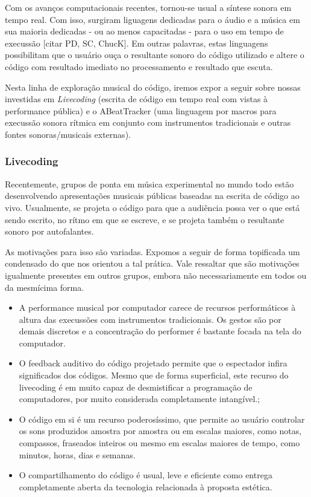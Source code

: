 Com os avanços computacionais recentes, tornou-se usual a síntese sonora
em tempo real. Com isso, surgiram liguagens dedicadas para o áudio e a música
em sua maioria dedicadas - ou ao menos capacitadas - para o uso 
em tempo de execussão [citar PD, SC, ChucK]. Em outras palavras, estas linguagens
possibilitam que o usuário ouça o resultante sonoro do código utilizado e altere
o código com resultado imediato no processamento e resultado que escuta.

Nesta linha de exploração musical do código, iremos expor a seguir sobre
nossas investidas em \emph{Livecoding} (escrita de código em tempo real
com vistas à performance pública) e o ABeatTracker (uma linguagem por macros
para execussão sonora rítmica em conjunto com instrumentos tradicionais e outras
fontes sonoras/musicais externas).


        \subsubsection{Livecoding}

Recentemente, grupos de ponta em música experimental no mundo todo estão
desenvolvendo apresentações musicais públicas baseadas na escrita
de código ao vivo. Usualmente, se projeta o código para que a audiência possa
ver o que está sendo escrito, no rítmo em que se escreve, e se projeta também
o resultante sonoro por autofalantes.

As motivações para isso são variadas. Expomos a seguir de forma topificada
um condensado do que nos orientou a tal prática. Vale ressaltar que são
motivações igualmente presentes em outros grupos, embora não necessariamente
em todos ou da mesmícima forma.

\begin{itemize}
    \item A performance musical por computador carece de recursos performáticos
    à altura das execussões com instrumentos tradicionais. Os gestos são por demais
    discretos e a concentração do performer é bastante focada na tela do computador.
    \item O feedback auditivo do código projetado permite que o espectador infira
    significados dos códigos. Mesmo que de forma superficial, este recurso do livecoding
    é em muito capaz de desmistificar a programação de computadores, por muito considerada
    completamente intangível.;
    \item O código em si é um recurso poderosíssimo, que permite ao usuário controlar
    os sons produzidos amostra por amostra ou em escalas maiores, como notas, compassos, fraseados
    inteiros ou mesmo em escalas maiores de tempo, como minutos, horas, dias e semanas.
    \item O compartilhamento do código é usual, leve e eficiente como entrega completamente
    aberta da tecnologia relacionada à proposta estética.
\end{itemize}


